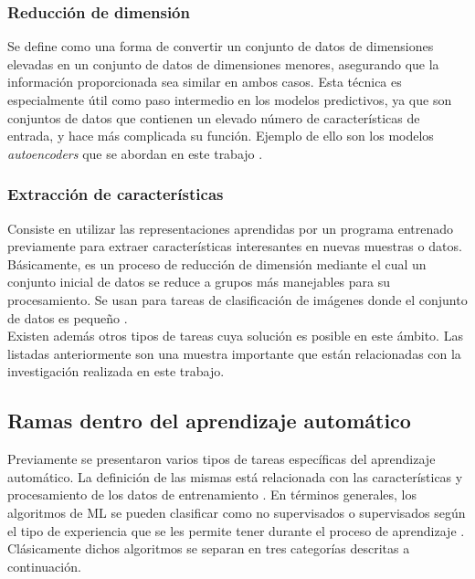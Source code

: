 \subsubsection{Reducción de dimensión}\label{1-RedDim}

Se define como una forma de convertir un conjunto de datos de dimensiones elevadas en un conjunto de datos de dimensiones menores, asegurando que la información proporcionada sea similar en ambos casos. Esta técnica es especialmente útil como paso intermedio en los modelos predictivos, ya que son conjuntos de datos que contienen un elevado número de características de entrada, y hace más complicada su función. Ejemplo de ello son los modelos \textit{autoencoders} que se abordan en este trabajo \cite{Chollet}.

\subsubsection{Extracción de características}\label{1-ExtCar}
Consiste en utilizar las representaciones aprendidas por un programa entrenado previamente para extraer características interesantes en nuevas muestras o datos. Básicamente, es un proceso de reducción de dimensión mediante el cual un conjunto inicial de datos se reduce a grupos más manejables para su procesamiento. Se usan para tareas de clasificación de imágenes donde el conjunto de datos es pequeño \cite{Chollet}.\\


Existen además otros tipos de tareas cuya solución es posible en este ámbito. Las listadas anteriormente son una muestra importante que están relacionadas con la investigación realizada en este trabajo.   

\subsection{Ramas dentro del aprendizaje automático}
\label{1-MLramas}

 Previamente se presentaron varios tipos de tareas específicas del aprendizaje automático. La definición de las mismas está relacionada con las características y procesamiento de los datos de entrenamiento \cite{Chollet}. En términos generales, los algoritmos de ML se pueden clasificar como no supervisados o supervisados según el tipo de experiencia que se les permite tener durante el proceso de aprendizaje \cite{BengioGood}. Clásicamente dichos algoritmos se separan en tres categorías descritas a continuación.
 
